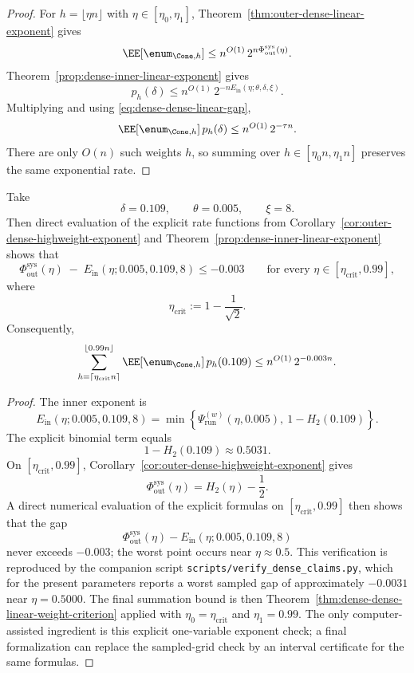 \begin{proof}
For \(h=\lfloor \eta n\rfloor\) with \(\eta\in[\eta_0,\eta_1]\), Theorem~\ref{thm:outer-dense-linear-exponent} gives
\[
\EE[\enum_{\Cone,h}]
\le
n^{O(1)}\,2^{n\Phi_{\mathrm{out}}^{\mathrm{sys}}(\eta)}.
\]
Theorem~\ref{prop:dense-inner-linear-exponent} gives
\[
p_h(\delta)
\le
n^{O(1)}\,2^{-nE_{\mathrm{in}}(\eta;\theta,\delta,\xi)}.
\]
Multiplying and using \eqref{eq:dense-dense-linear-gap},
\[
\EE[\enum_{\Cone,h}]\,p_h(\delta)
\le
n^{O(1)}\,2^{-\tau n}.
\]
There are only \(O(n)\) such weights \(h\), so summing over
\(h\in[\eta_0 n,\eta_1 n]\) preserves the same exponential rate.
\end{proof}

\begin{theorem}
\label{prop:dense-dense-highweight-gap}
Take
\[
\delta=0.109,
\qquad
\theta=0.005,
\qquad
\xi=8.
\]
Then direct evaluation of the explicit rate functions from
Corollary~\ref{cor:outer-dense-highweight-exponent} and
Theorem~\ref{prop:dense-inner-linear-exponent} shows that
\[
\Phi_{\mathrm{out}}^{\mathrm{sys}}(\eta)
\;
-\;
E_{\mathrm{in}}(\eta;0.005,0.109,8)
\le -0.003
\qquad
\text{for every }\eta\in[\eta_{\mathrm{crit}},0.99],
\]
where
\[
\eta_{\mathrm{crit}}:=1-\frac{1}{\sqrt2}.
\]
Consequently,
\[
\sum_{h=\lceil \eta_{\mathrm{crit}}n\rceil}^{\lfloor 0.99n\rfloor}
\EE[\enum_{\Cone,h}]\,p_h(0.109)
\le
n^{O(1)}\,2^{-0.003n}.
\]
\end{theorem}

\begin{proof}
The inner exponent is
\[
E_{\mathrm{in}}(\eta;0.005,0.109,8)
=
\min\!\left\{
\Psi_{\mathrm{run}}^{(w)}(\eta,0.005),\
1-H_2(0.109)
\right\}.
\]
The explicit binomial term equals
\[
1-H_2(0.109)\approx 0.5031.
\]
On \([\eta_{\mathrm{crit}},0.99]\), Corollary~\ref{cor:outer-dense-highweight-exponent} gives
\[
\Phi_{\mathrm{out}}^{\mathrm{sys}}(\eta)=H_2(\eta)-\frac12.
\]
A direct numerical evaluation of the explicit formulas on \([\eta_{\mathrm{crit}},0.99]\) then shows that the gap
\[
\Phi_{\mathrm{out}}^{\mathrm{sys}}(\eta)-E_{\mathrm{in}}(\eta;0.005,0.109,8)
\]
never exceeds \(-0.003\); the worst point occurs near \(\eta\approx 0.5\).
This verification is reproduced by the companion script
\texttt{scripts/verify\_dense\_claims.py}, which for the present parameters reports a worst sampled gap
of approximately \(-0.0031\) near \(\eta=0.5000\).
The final summation bound is then Theorem~\ref{thm:dense-dense-linear-weight-criterion}
applied with \(\eta_0=\eta_{\mathrm{crit}}\) and \(\eta_1=0.99\).
The only computer-assisted ingredient is this explicit one-variable exponent
check; a final formalization can replace the sampled-grid check by an interval
certificate for the same formulas.
\end{proof}

